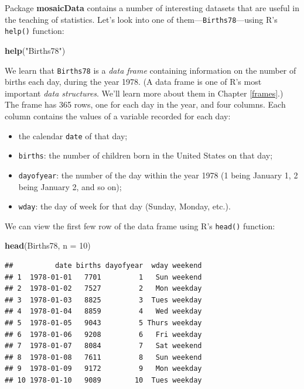 \documentclass[]{book}
\makeatletter
\newenvironment{Shaded}{\begin{snugshade}}{\end{snugshade}}
\newcommand{\KeywordTok}[1]{\textcolor[rgb]{0.13,0.29,0.53}{\textbf{#1}}}
\newcommand{\DataTypeTok}[1]{\textcolor[rgb]{0.13,0.29,0.53}{#1}}
\newcommand{\DecValTok}[1]{\textcolor[rgb]{0.00,0.00,0.81}{#1}}
\newcommand{\StringTok}[1]{\textcolor[rgb]{0.31,0.60,0.02}{#1}}
\newcommand{\NormalTok}[1]{#1}
\providecommand{\tightlist}{%
  \setlength{\itemsep}{0pt}\setlength{\parskip}{0pt}}
\newenvironment{kframe}{%
\medskip{}
\setlength{\fboxsep}{.8em}
 \def\at@end@of@kframe{}%
 \ifinner\ifhmode%
  \def\at@end@of@kframe{\end{minipage}}%
  \begin{minipage}{\columnwidth}%
 \fi\fi%
 \def\FrameCommand##1{\hskip\@totalleftmargin \hskip-\fboxsep
 \colorbox{shadecolor}{##1}\hskip-\fboxsep
     \hskip-\linewidth \hskip-\@totalleftmargin \hskip\columnwidth}%
 \MakeFramed {\advance\hsize-\width
   \@totalleftmargin\z@ \linewidth\hsize
   \@setminipage}}%
 {\par\unskip\endMakeFramed%
 \at@end@of@kframe}
\renewenvironment{Shaded}{\begin{kframe}}{\end{kframe}}
\theoremstyle{definition}
\theoremstyle{definition}
\theoremstyle{definition}
\theoremstyle{remark}
\makeatother
\begin{document}
Package \textbf{mosaicData} contains a number of interesting datasets
that are useful in the teaching of statistics. Let's look into one of
them---\texttt{Births78}---using R's \texttt{help()} function:

\begin{Shaded}
\begin{Highlighting}[]
\KeywordTok{help}\NormalTok{(}\StringTok{"Births78"}\NormalTok{)}
\end{Highlighting}
\end{Shaded}

We learn that \texttt{Births78} is a \emph{data frame} containing
information on the number of births each day, during the year 1978. (A
data frame is one of R's most important \emph{data structures}. We'll
learn more about them in Chapter \ref{frames}.) The frame has 365 rows,
one for each day in the year, and four columns. Each column contains the
values of a variable recorded for each day:

\begin{itemize}
\tightlist
\item
  the calendar \texttt{date} of that day;
\item
  \texttt{births}: the number of children born in the United States on
  that day;
\item
  \texttt{dayofyear}: the number of the day within the year 1978 (1
  being January 1, 2 being January 2, and so on);
\item
  \texttt{wday}: the day of week for that day (Sunday, Monday, etc.).
\end{itemize}

We can view the first few row of the data frame using R's
\texttt{head()} function:

\begin{Shaded}
\begin{Highlighting}[]
\KeywordTok{head}\NormalTok{(Births78, }\DataTypeTok{n =} \DecValTok{10}\NormalTok{)}
\end{Highlighting}
\end{Shaded}

\begin{verbatim}
##          date births dayofyear  wday weekend
## 1  1978-01-01   7701         1   Sun weekend
## 2  1978-01-02   7527         2   Mon weekday
## 3  1978-01-03   8825         3  Tues weekday
## 4  1978-01-04   8859         4   Wed weekday
## 5  1978-01-05   9043         5 Thurs weekday
## 6  1978-01-06   9208         6   Fri weekday
## 7  1978-01-07   8084         7   Sat weekend
## 8  1978-01-08   7611         8   Sun weekend
## 9  1978-01-09   9172         9   Mon weekday
## 10 1978-01-10   9089        10  Tues weekday
\end{verbatim}
\end{document}
